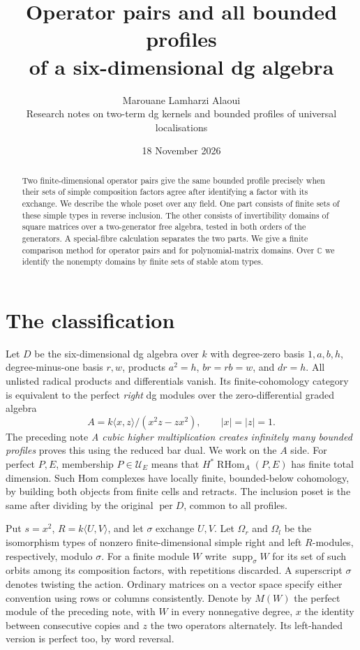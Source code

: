 \documentclass[11pt]{article}
\title{Operator pairs and all bounded profiles\\ of a six-dimensional dg algebra}
\author{Marouane Lamharzi Alaoui\\
\small Research notes on two-term dg kernels and bounded profiles of universal localisations}
\date{18 November 2026}
\newcommand{\per}{\operatorname{per}}
\newcommand{\HHom}{\operatorname{RHom}}
\newcommand{\supp}{\operatorname{supp}_{\sigma}}
\newcommand{\prof}{\mathcal U}
\begin{document}
\maketitle
\begin{abstract}
Two finite-dimensional operator pairs give the same bounded profile precisely
when their sets of simple composition factors agree after identifying a
factor with its exchange. We describe the whole poset over any field.
One part consists of finite sets of these simple types in reverse inclusion.
The other consists of invertibility domains of square matrices over a
two-generator free algebra, tested in both orders of the generators.
A special-fibre calculation separates the two parts. We give a finite
comparison method for operator pairs and for polynomial-matrix domains.
Over $\mathbb C$ we identify the
nonempty domains by finite sets of stable atom types.
\end{abstract}

\section{The classification}
Let $D$ be the six-dimensional dg algebra over $k$ with degree-zero
basis $1,a,b,h$, degree-minus-one basis $r,w$, products $a^2=h$,
$br=rb=w$, and $dr=h$. All unlisted radical products and differentials
vanish. Its finite-cohomology category is equivalent to the perfect
\emph{right} dg modules over the zero-differential graded algebra
\[
 A=k\langle x,z\rangle/(x^2z-zx^2),\qquad |x|=|z|=1 .
\]
The preceding note \emph{A cubic higher multiplication creates infinitely
many bounded profiles} proves this using the reduced bar dual. We work
on the $A$ side. For perfect $P,E$, membership $P\in\prof_E$ means that
$H^*\HHom_A(P,E)$ has finite total dimension. Such Hom complexes have
locally finite, bounded-below cohomology, by building both objects from
finite cells and retracts. The inclusion poset is the same after dividing
by the original $\per D$, common to all profiles.

Put $s=x^2$, $R=k\langle U,V\rangle$, and let $\sigma$ exchange $U,V$.
Let $\Omega_r$ and $\Omega_l$ be the isomorphism types of nonzero
finite-dimensional simple right and left $R$-modules, respectively,
modulo $\sigma$. For a finite module $W$ write $\supp W$ for its
set of such orbits among its composition factors, with repetitions
discarded. A superscript $\sigma$ denotes twisting the action. Ordinary
matrices on a vector space specify either convention using rows or
columns consistently. Denote by $M(W)$ the perfect module of the preceding
note, with $W$ in every nonnegative degree, $x$ the identity between
consecutive copies and $z$ the two operators alternately. Its left-handed
version is perfect too, by word reversal.
\end{document}
